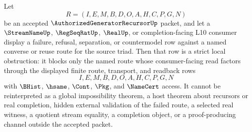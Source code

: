 \begin{corollary}
\label{cor:authorized-generator-recursor-l10-source-triad-strict-obstruction}
Let
$$
R=(I,E,M,B,D,O,A,H,C,P,G,N)
$$
be an accepted $\AuthorizedGeneratorRecursorUp$ packet, and let a $\StreamNameUp$, $\RegSeqRatUp$, $\RealUp$, or completion-facing L10 consumer display a failure, refusal, separation, or countermodel row against a named converse or reuse route for the source triad. Then that row is a strict local obstruction: it blocks only the named route whose consumer-facing read factors through the displayed finite route, transport, and readback rows
$$
I,E,M,B,D,O,A,H,C,P,G,N
$$
with $\BHist$, $\hsame$, $\Cont$, $\Pkg$, and $\NameCert$ access. It cannot be reinterpreted as a global impossibility theorem, a host theorem about recursors or real completion, hidden external validation of the failed route, a selected real witness, a quotient stream equality, a completion object, or a proof-producing channel outside the accepted packet.
\end{corollary}
